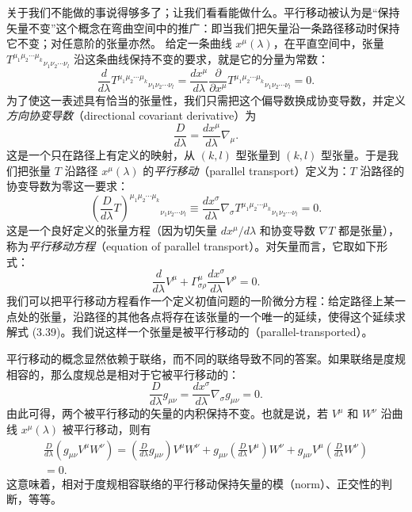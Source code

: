 关于我们不能做的事说得够多了；让我们看看能做什么。平行移动被认为是“保持矢量不变”这个概念在弯曲空间中的推广：即当我们把矢量沿一条路径移动时保持它不变；对任意阶的张量亦然。
给定一条曲线 $x^\mu(\lambda)$，在平直空间中，张量 $T^{\mu_1\mu_2\cdots\mu_k}{}_{\nu_1\nu_2\cdots\nu_l}$ 沿这条曲线保持不变的要求，就是它的分量为常数：
\begin{equation*}
\frac{d}{d\lambda}T^{\mu_1\mu_2\cdots\mu_k}{}_{\nu_1\nu_2\cdots\nu_l} = \frac{dx^\mu}{d\lambda}\frac{\partial}{\partial x^\mu}T^{\mu_1\mu_2\cdots\mu_k}{}_{\nu_1\nu_2\cdots\nu_l} = 0.
\end{equation*}
为了使这一表述具有恰当的张量性，我们只需把这个偏导数换成协变导数，并定义\emph{方向协变导数}（directional covariant derivative）为
\begin{equation*}
\frac{D}{d\lambda} = \frac{dx^\mu}{d\lambda}\nabla_\mu.
\tag{3.38}
\end{equation*}
这是一个只在路径上有定义的映射，从 $(k,l)$ 型张量到 $(k,l)$ 型张量。于是我们把张量 $T$ 沿路径 $x^\mu(\lambda)$ 的\emph{平行移动}（parallel transport）定义为：$T$ 沿路径的协变导数为零这一要求：
\begin{equation*}
\left(\frac{D}{d\lambda}T\right)^{\mu_1\mu_2\cdots\mu_k}{}_{\nu_1\nu_2\cdots\nu_l} \equiv \frac{dx^\sigma}{d\lambda}\nabla_\sigma T^{\mu_1\mu_2\cdots\mu_k}{}_{\nu_1\nu_2\cdots\nu_l} = 0.
\tag{3.39}
\end{equation*}
这是一个良好定义的张量方程（因为切矢量 $dx^\mu/d\lambda$ 和协变导数 $\nabla T$ 都是张量），称为\emph{平行移动方程}（equation of parallel transport）。对矢量而言，它取如下形式：
\begin{equation*}
\frac{d}{d\lambda}V^\mu + \Gamma^\mu_{\sigma\rho}\frac{dx^\sigma}{d\lambda}V^\rho = 0.
\tag{3.40}
\end{equation*}
我们可以把平行移动方程看作一个定义初值问题的一阶微分方程：给定路径上某一点处的张量，沿路径的其他各点将存在该张量的一个唯一的延续，使得这个延续求解式 (3.39)。我们说这样一个张量是被平行移动的（parallel-transported）。

平行移动的概念显然依赖于联络，而不同的联络导致不同的答案。如果联络是度规相容的，那么度规总是相对于它被平行移动的：
\begin{equation*}
\frac{D}{d\lambda}g_{\mu\nu} = \frac{dx^\sigma}{d\lambda}\nabla_\sigma g_{\mu\nu} = 0.
\tag{3.41}
\end{equation*}
由此可得，两个被平行移动的矢量的内积保持不变。也就是说，若 $V^\mu$ 和 $W^\nu$ 沿曲线 $x^\mu(\lambda)$ 被平行移动，则有
\begin{align*}
\frac{D}{d\lambda}(g_{\mu\nu}V^\mu W^\nu) = \left(\frac{D}{d\lambda}g_{\mu\nu}\right)V^\mu W^\nu + g_{\mu\nu}\left(\frac{D}{d\lambda}V^\mu\right)W^\nu + g_{\mu\nu}V^\mu\left(\frac{D}{d\lambda}W^\nu\right)\\
= 0.
\tag{3.42}
\end{align*}
这意味着，相对于度规相容联络的平行移动保持矢量的模（norm）、正交性的判断，等等。

